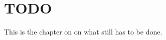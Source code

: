 \documentclass[MachineLearning]{subfiles}
\begin{document}
\section{TODO}
This is the chapter on on what still has to be done.
\end{document}
